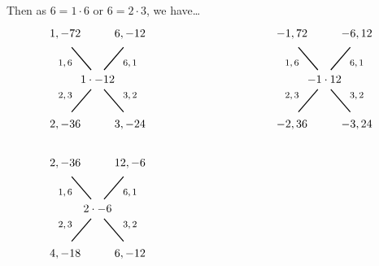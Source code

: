 \documentclass[11pt,letterpaper]{article}
\begin{document}
Then as $6= 1 \cdot 6$ or $6= 2 \cdot 3$, we have\dots
	\[
	\begin{tikzpicture}
	\node at (0,0) {$1 \cdot -12$};

	\node at (-1,0.5) {\footnotesize$1, 6$};
	\draw[line width=0.03cm,label={1}] (-0.2,0.3) -- (-0.8,1);
	\node at (-1,1.4) {$1, -72$};

	\node at (1,0.5) {\footnotesize$6, 1$};
	\draw[line width=0.03cm,label={1}] (0.2,0.3) -- (0.8,1);
	\node at (1,1.4) {$6, -12$};	
	
	\node at (-1,-0.5) {\footnotesize$2, 3$};
	\draw[line width=0.03cm,label={1}] (-0.2,-0.3) -- (-0.8,-1);
	\node at (-1,-1.4) {$2, -36$};

	\node at (1,-0.5) {\footnotesize$3, 2$};
	\draw[line width=0.03cm,label={1}] (0.2,-0.3) -- (0.8,-1);
	\node at (1,-1.4) {$3, -24$};

	\tikzset{shift={(7,0)}}
	
	\node at (0,0) {$-1 \cdot 12$};

	\node at (-1,0.5) {\footnotesize$1, 6$};
	\draw[line width=0.03cm,label={1}] (-0.2,0.3) -- (-0.8,1);
	\node at (-1,1.4) {$-1, 72$};

	\node at (1,0.5) {\footnotesize$6, 1$};
	\draw[line width=0.03cm,label={1}] (0.2,0.3) -- (0.8,1);
	\node at (1,1.4) {$-6, 12$};	
	
	\node at (-1,-0.5) {\footnotesize$2, 3$};
	\draw[line width=0.03cm,label={1}] (-0.2,-0.3) -- (-0.8,-1);
	\node at (-1,-1.4) {$-2, 36$};

	\node at (1,-0.5) {\footnotesize$3, 2$};
	\draw[line width=0.03cm,label={1}] (0.2,-0.3) -- (0.8,-1);
	\node at (1,-1.4) {$-3, 24$};
		
	\tikzset{shift={(-7,-4)}}
	
	\node at (0,0) {$2 \cdot -6$};

	\node at (-1,0.5) {\footnotesize$1, 6$};
	\draw[line width=0.03cm,label={1}] (-0.2,0.3) -- (-0.8,1);
	\node at (-1,1.4) {$2, -36$};

	\node at (1,0.5) {\footnotesize$6, 1$};
	\draw[line width=0.03cm,label={1}] (0.2,0.3) -- (0.8,1);
	\node at (1,1.4) {$12, -6$};	
	
	\node at (-1,-0.5) {\footnotesize$2, 3$};
	\draw[line width=0.03cm,label={1}] (-0.2,-0.3) -- (-0.8,-1);
	\node at (-1,-1.4) {$4, -18$};

	\node at (1,-0.5) {\footnotesize$3, 2$};
	\draw[line width=0.03cm,label={1}] (0.2,-0.3) -- (0.8,-1);
	\node at (1,-1.4) {$6, -12$};
	
	\tikzset{shift={(7,0)}}
	

\end{tikzpicture}\]
\end{document}
